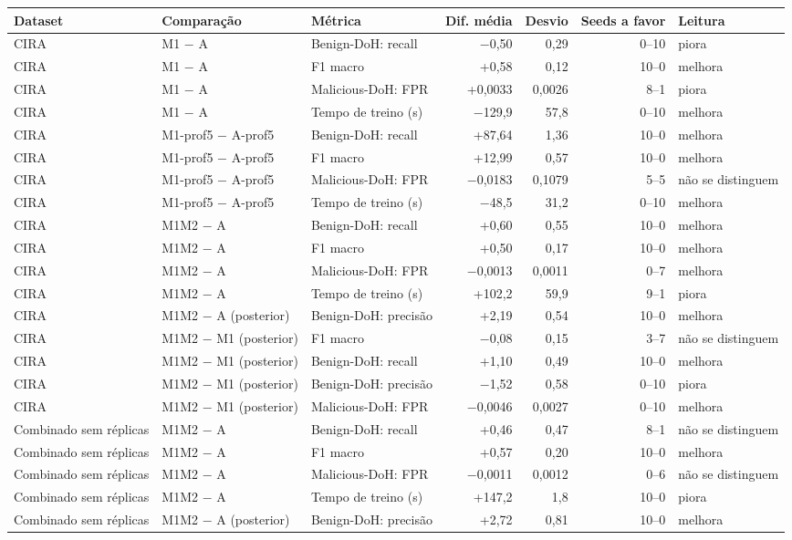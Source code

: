 \begin{tabular}{lllrrrl}
\hline
\textbf{Dataset} & \textbf{Comparação} & \textbf{Métrica} & \textbf{Dif. média} & \textbf{Desvio} & \textbf{Seeds a favor} & \textbf{Leitura} \\ \hline
CIRA & M1 $-$ A & Benign-DoH: recall & $-$0,50 & 0,29 & 0--10 & piora \\
CIRA & M1 $-$ A & F1 macro & +0,58 & 0,12 & 10--0 & melhora \\
CIRA & M1 $-$ A & Malicious-DoH: FPR & +0,0033 & 0,0026 & 8--1 & piora \\
CIRA & M1 $-$ A & Tempo de treino (s) & $-$129,9 & 57,8 & 0--10 & melhora \\
CIRA & M1-prof5 $-$ A-prof5 & Benign-DoH: recall & +87,64 & 1,36 & 10--0 & melhora \\
CIRA & M1-prof5 $-$ A-prof5 & F1 macro & +12,99 & 0,57 & 10--0 & melhora \\
CIRA & M1-prof5 $-$ A-prof5 & Malicious-DoH: FPR & $-$0,0183 & 0,1079 & 5--5 & não se distinguem \\
CIRA & M1-prof5 $-$ A-prof5 & Tempo de treino (s) & $-$48,5 & 31,2 & 0--10 & melhora \\
CIRA & M1M2 $-$ A & Benign-DoH: recall & +0,60 & 0,55 & 10--0 & melhora \\
CIRA & M1M2 $-$ A & F1 macro & +0,50 & 0,17 & 10--0 & melhora \\
CIRA & M1M2 $-$ A & Malicious-DoH: FPR & $-$0,0013 & 0,0011 & 0--7 & melhora \\
CIRA & M1M2 $-$ A & Tempo de treino (s) & +102,2 & 59,9 & 9--1 & piora \\
CIRA & M1M2 $-$ A (posterior) & Benign-DoH: precisão & +2,19 & 0,54 & 10--0 & melhora \\
CIRA & M1M2 $-$ M1 (posterior) & F1 macro & $-$0,08 & 0,15 & 3--7 & não se distinguem \\
CIRA & M1M2 $-$ M1 (posterior) & Benign-DoH: recall & +1,10 & 0,49 & 10--0 & melhora \\
CIRA & M1M2 $-$ M1 (posterior) & Benign-DoH: precisão & $-$1,52 & 0,58 & 0--10 & piora \\
CIRA & M1M2 $-$ M1 (posterior) & Malicious-DoH: FPR & $-$0,0046 & 0,0027 & 0--10 & melhora \\
\hline
Combinado sem réplicas & M1M2 $-$ A & Benign-DoH: recall & +0,46 & 0,47 & 8--1 & não se distinguem \\
Combinado sem réplicas & M1M2 $-$ A & F1 macro & +0,57 & 0,20 & 10--0 & melhora \\
Combinado sem réplicas & M1M2 $-$ A & Malicious-DoH: FPR & $-$0,0011 & 0,0012 & 0--6 & não se distinguem \\
Combinado sem réplicas & M1M2 $-$ A & Tempo de treino (s) & +147,2 & 1,8 & 10--0 & piora \\
Combinado sem réplicas & M1M2 $-$ A (posterior) & Benign-DoH: precisão & +2,72 & 0,81 & 10--0 & melhora \\
\hline
\end{tabular}
